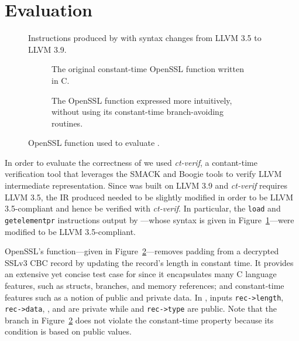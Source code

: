 \section{Evaluation}
\label{sec:evaluation}

\begin{figure}
	
	\caption{Instructions produced by \constc with syntax changes from LLVM 3.5 to LLVM 3.9.}
	\label{table:llvm-instr-syntax}\floatspace
\end{figure}

\begin{figure*}
    \centering
    \begin{subfigure}[b]{0.49\textwidth}
		\dbox{}
		\caption{The original constant-time OpenSSL function written in C.\newline}
		\label{fig:openssl-original}
    \end{subfigure}
    \begin{subfigure}[b]{0.49\textwidth}
		\dbox{}
		\caption{The OpenSSL function expressed more intuitively, without using its constant-time branch-avoiding routines.}
		\label{fig:openssl-intuitive}
    \end{subfigure}
    \caption{OpenSSL function used to evaluate \constc.}\label{fig:openssl}\floatspace
\end{figure*}

In order to evaluate the correctness of \constc we used \emph{ct-verif}\cite{almeida2016}, a contant-time verification tool that leverages the SMACK and Boogie tools to verify LLVM intermediate representation. Since \constc was built on LLVM 3.9 and \emph{ct-verif} requires LLVM 3.5, the IR \constc produced needed to be slightly modified in order to be LLVM 3.5-compliant and hence be verified with \emph{ct-verif}. In particular, the \texttt{load} and \texttt{getelementpr} instructions output by \constc---whose syntax is given in Figure~\ref{table:llvm-instr-syntax}---were modified to be LLVM 3.5-compliant.

OpenSSL's  \linebreak function---given in Figure~\ref{fig:openssl-original}---removes padding from a decrypted SSLv3 CBC record by updating the record's length in constant time. It provides an extensive yet concise test case for \constc since it encapsulates many C language features, such as structs, branches, and memory references; and constant-time features such as a notion of public and private data. In , inputs \texttt{rec->length}, \texttt{rec->data}, , and  are private while  and \texttt{rec->type} are public. Note that the branch in Figure~\ref{fig:openssl-original} does not violate the constant-time property because its condition is based on public values.

